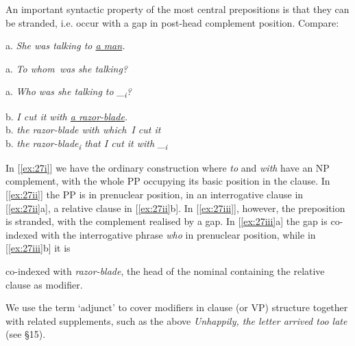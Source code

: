 An important syntactic property of the most central prepositions is that they can be {stranded}, i.e. occur with a gap in post-head complement position. Compare:
\begin{examples}
    \item \label{ex:27}\noindent\begin{minipage}[t]{0.5\linewidth}\vspace{-6pt}
        \begin{examples}
            \item \label{ex:27i}
                    a. \textit{She was talking \ob to \uline{a man}\cb.}
            \item \label{ex:27ii}
                    a. \textit{\ob To whom\cb~was she talking?}

            \item \label{ex:27iii}
                    a. \textit{Who was she talking \ob to \_\textsubscript{i}\cb?}
        \end{examples}
    \end{minipage}
    \begin{minipage}[t]{0.5\linewidth}
        b. \textit{I cut it with \uline{a razor-blade}.}\\
        b. \textit{the razor-blade \ob with which\cb~I cut it}\\
        b. \textit{the razor-blade\textsubscript{i} that I cut it \ob with \_\textsubscript{i}\cb}
    \end{minipage}
\end{examples}
In [\ref{ex:27i}] we have the ordinary construction where \textit{to} and \textit{with} have an NP complement, with the whole PP occupying its basic position in the clause. In [\ref{ex:27ii}] the PP is in prenuclear position, in an interrogative clause in [\ref{ex:27ii}a], a relative clause in [\ref{ex:27ii}b]. In [\ref{ex:27iii}], however, the preposition is stranded, with the complement realised by a gap. In [\ref{ex:27iii}a] the gap is co-indexed with the interrogative phrase \textit{who} in prenuclear position, while in [\ref{ex:27iii}b] it is

\newpage

\noindent co-indexed with \textit{razor-blade}, the head of the nominal containing the relative clause as modifier.


We use the term `adjunct' to cover modifiers in clause (or VP) structure together with related supplements, such as the above \textit{Unhappily, the letter arrived too late} (see §15).

